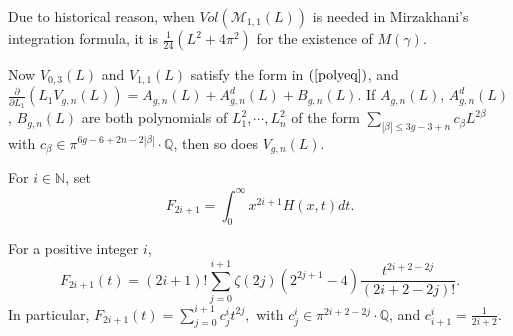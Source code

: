 \begin{remark}
Due to historical reason, when $Vol(\mathscr{M}_{1,1}(L))$ is needed in  Mirzakhani's integration  formula, it is $\frac{1}{24}(L^2+4\pi^2)$ for the existence of  $M(\gamma)$.
\end{remark}

Now $V_{0,3}(L)$ and $V_{1,1}(L)$ satisfy the form in $(\ref{polyeq})$, and $\frac{\partial }{\partial L_1}(L_1V_{g,n}(L))=A_{g,n}(L)+A_{g,n}^{d}(L)+B_{g,n}(L).$
If $A_{g,n}(L)$, $A_{g,n}^{d}(L)$, $B_{g,n}(L)$ are both polynomials of $L_1^2,\cdots,L_n^2$ of the form $\sum_{|\beta|\leq 3g-3+n}c_\beta L^{2\beta}$ with $c_\beta\in \pi^{6g-6+2n-2|\beta|}\cdot \mathbb{Q}$, then so does $V_{g,n}(L)$.

\begin{definition}
For $i\in \mathbb{N}$, set $$
F_{2i+1}=\int_0^\infty x^{2i+1}H(x,t)dt.
$$
\end{definition}

\begin{lemma}\label{Fzeta}
For a positive integer $i$,
\begin{equation}
    F_{2i+1}(t)=(2i+1)!\sum_{j=0}^{i+1}\zeta(2j)(2^{2j+1}-4)\frac{t^{2i+2-2j}}{(2i+2-2j)!}.
\end{equation}
In particular, $F_{2i+1}(t)=\sum_{j=0}^{i+1}c_j^i t^{2j},$ with $c_j^i\in \pi^{2i+2-2j}\cdot\mathbb{Q}$, and $c_{i+1}^i=\frac{1}{2i+2}$.
\end{lemma}

